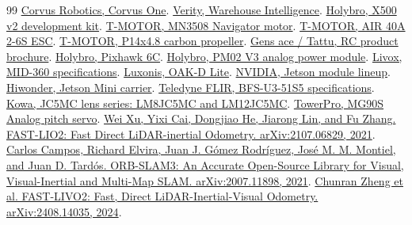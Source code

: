 \documentclass[a4paper,11pt]{article}
\begin{document}
\renewcommand{\refname}{R{\fontsize{11.2}{14}\selectfont EFERENCES}}\begin{thebibliography}{99}\renewcommand{\makelabel}[1]{\hfill#1}\setlength{\itemsep}{1pt}\setlength{\parskip}{0pt}
 \href{https://www.corvus-robotics.com/corvus-one}{Corvus Robotics, Corvus One}.
 \href{https://www.verity.net/}{Verity, Warehouse Intelligence}.
 \href{https://docs.holybro.com/drone-development-kit/px4-development-kit-x500v2}{Holybro, X500 v2 development kit}.
 \href{https://store.tmotor.com/product/mn3508-motor-navigator-type.html}{T-MOTOR, MN3508 Navigator motor}.
 \href{https://store.tmotor.com/product/air-40a-6s-esc.html}{T-MOTOR, AIR 40A 2-6S ESC}.
 \href{https://store.tmotor.com/product/polish-carbon-fiber-14x4_8-prop.html}{T-MOTOR, P14x4.8 carbon propeller}.
 \href{https://www.genstattu.com/content/instock/rc_product_brochure.pdf}{Gens ace / Tattu, RC product brochure}.
 \href{https://holybro.com/products/pixhawk-6c}{Holybro, Pixhawk 6C}.
 \href{https://holybro.com/collections/power-modules-pdbs/products/pm02-v3-12s-power-module}{Holybro, PM02 V3 analog power module}.
 \href{https://www.livoxtech.com/mid-360/specs}{Livox, MID-360 specifications}.
 \href{https://docs.luxonis.com/hardware/products/OAK-D%20Lite}{Luxonis, OAK-D Lite}.
 \href{https://developer.nvidia.com/embedded/jetson-modules}{NVIDIA, Jetson module lineup}.
 \href{https://www.hiwonder.com/products/mini-carrier}{Hiwonder, Jetson Mini carrier}.
 \href{https://softwareservices.flir.com/BFS-U3-51S5/latest/Model/spec.html}{Teledyne FLIR, BFS-U3-51S5 specifications}.
 \href{https://kowa-fa-sea.com.sg/industrial-lens/jc5mc-series/}{Kowa, JC5MC lens series: LM8JC5MC and LM12JC5MC}.
 \href{https://torqpro.com/product/mg90s-analog/}{TowerPro, MG90S Analog pitch servo}.
 \href{https://arxiv.org/abs/2107.06829}{Wei Xu, Yixi Cai, Dongjiao He, Jiarong Lin, and Fu Zhang. FAST-LIO2: Fast Direct LiDAR-inertial Odometry. arXiv:2107.06829, 2021}.
 \href{https://arxiv.org/abs/2007.11898}{Carlos Campos, Richard Elvira, Juan J. Gómez Rodríguez, José M. M. Montiel, and Juan D. Tardós. ORB-SLAM3: An Accurate Open-Source Library for Visual, Visual-Inertial and Multi-Map SLAM. arXiv:2007.11898, 2021}.
 \href{https://arxiv.org/abs/2408.14035}{Chunran Zheng et al. FAST-LIVO2: Fast, Direct LiDAR-Inertial-Visual Odometry. arXiv:2408.14035, 2024}.

\end{thebibliography}
\end{document}

